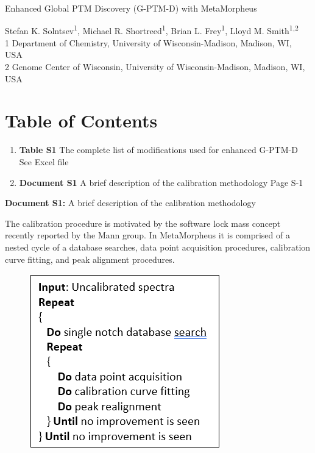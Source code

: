 \documentclass{article}
\begin{document}
	

{\Huge Enhanced Global PTM Discovery (G-PTM-D) with MetaMorpheus}

{\Large Stefan K. Solntsev\textsuperscript{1}, Michael R. Shortreed\textsuperscript{1}, Brian L. Frey\textsuperscript{1}, Lloyd M. Smith\textsuperscript{1,2}}\\
{\footnotesize 1 Department of Chemistry, University of Wisconsin-Madison, Madison, WI, USA}\\
{\footnotesize 2 Genome Center of Wisconsin, University of Wisconsin-Madison, Madison, WI, USA}\\

\section{Table of Contents}


\begin{enumerate}
\item \textbf{Table S1} The complete list of modifications used for enhanced G-PTM-D\\
      See Excel file
\item \textbf{Document S1}   A brief description of the calibration methodology      \hfill      Page S-1
\end{enumerate}

\newpage

{\huge \textbf{Document S1:} A brief description of the calibration methodology}

The calibration procedure is motivated by the software lock mass concept recently reported by the Mann group. 
In MetaMorpheus it is comprised of a nested cycle of a database searches, data point acquisition procedures, calibration curve fitting, and peak alignment procedures. 

\begin{figure}[ht]
\includegraphics{supFig1.png}
\end{figure}
\end{document}
